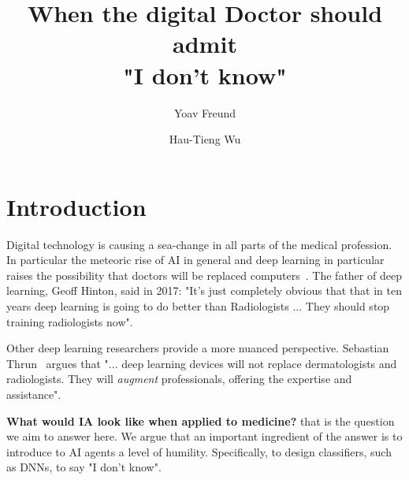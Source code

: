 \documentclass[9pt,twocolumn,twoside]{pnas-new}
\author[1]{Yoav Freund}
\author[2]{Hau-Tieng Wu}
\affil[1]{UCSD, department, city, postcode, country}
\affil[2]{Duke, department, city, postcode, country}
\title{When the digital Doctor should admit\\ "I don't know"}
\begin{document}
\maketitle

\thispagestyle{firststyle}

\section*{Introduction}

Digital technology is causing a sea-change in all parts of the medical
profession. In particular the meteoric rise of AI in general and deep
learning in particular raises the possibility that doctors will be
replaced computers~\cite{Mukherjee2017}. The father of deep learning,
Geoff Hinton, said in 2017: "It's just completely obvious that that in
ten years deep learning is going to do better than Radiologists
... They should stop training radiologists now".

Other deep learning researchers provide a more nuanced
perspective. Sebastian
Thrun~\cite{Mukherjee2017,esteva2017dermatologist} argues that
"... deep learning devices will not replace dermatologists and
radiologists. They will {\em augment} professionals, offering the
expertise and assistance".


{\bf What would IA look like when applied to medicine?} that is the
question we aim to answer here.  We argue that an important ingredient
of the answer is to introduce to AI agents a level of
humility. Specifically, to design classifiers, such as DNNs, to say "I
don't know".
\end{document}
